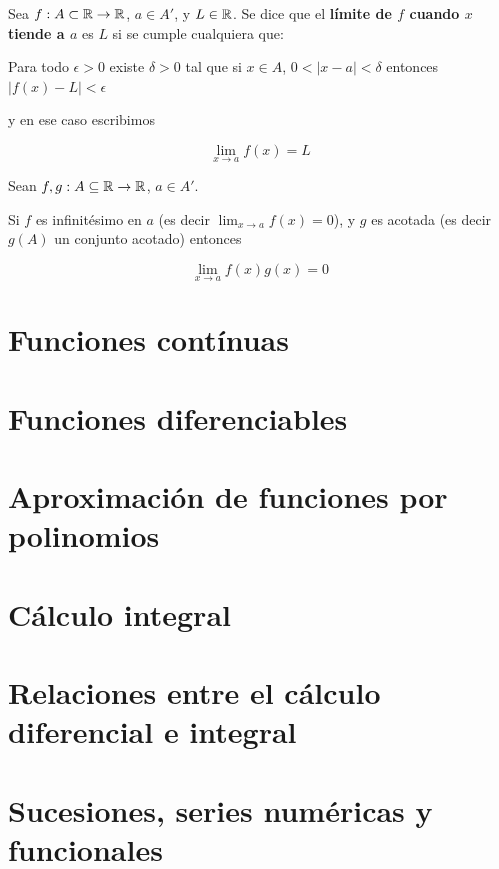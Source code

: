\begin{definition}[Límite] \label{limite_r}
Sea $f : A \subset \mathbb{R} \to \mathbb{R}$, $ a \in A'$, y $L \in \mathbb{R}$.  Se dice que el \textbf{límite de $f$ cuando $x$ tiende a $a$}  es $L$ si se cumple cualquiera que:

Para todo $\epsilon > 0$ existe $\delta > 0$ tal que si $x \in A$, $0 < |x-a| < \delta$ entonces $|f(x) - L| < \epsilon$

y en ese caso escribimos

$$ \displaystyle \lim_{x \to a} f(x) = L $$
\end{definition}


\begin{theorem} \label{cero_por_acotada}
Sean $f,g:A \subseteq \mathbb{R} \to \mathbb{R}$, $a \in A'$.

Si $f$ es infinitésimo en $a$ (es decir $ \lim_{x \to a} f(x) = 0$), y $g$ es acotada (es decir $g(A)$ un conjunto acotado) entonces

$$ \lim_{x \to a} f(x)g(x) = 0 $$
\end{theorem}




\chapter{Funciones contínuas}
\chapter{Funciones diferenciables}
\chapter{Aproximación de funciones por polinomios}
\chapter{Cálculo integral}
\chapter{Relaciones entre el cálculo diferencial e integral}
\chapter{Sucesiones, series numéricas y funcionales}



